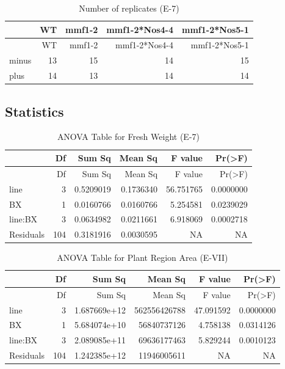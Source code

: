 \documentclass[
  10pt,
]{article}
\begin{document}
\begin{longtable}[]{@{}lrrrr@{}}
\caption{Number of replicates (E-7)}\tabularnewline
\toprule\noalign{}
& WT & mmf1-2 & mmf1-2*Nos4-4 & mmf1-2*Nos5-1 \\
\midrule\noalign{}
\endfirsthead
\toprule\noalign{}
& WT & mmf1-2 & mmf1-2*Nos4-4 & mmf1-2*Nos5-1 \\
\midrule\noalign{}
\endhead
\bottomrule\noalign{}
\endlastfoot
minus & 13 & 15 & 14 & 15 \\
plus & 14 & 13 & 14 & 14 \\
\end{longtable}

\subsection{Statistics}\label{statistics-3}

\begin{longtable}[]{@{}lrrrrr@{}}
\caption{ANOVA Table for Fresh Weight (E-7)}\tabularnewline
\toprule\noalign{}
& Df & Sum Sq & Mean Sq & F value & Pr(\textgreater F) \\
\midrule\noalign{}
\endfirsthead
\toprule\noalign{}
& Df & Sum Sq & Mean Sq & F value & Pr(\textgreater F) \\
\midrule\noalign{}
\endhead
\bottomrule\noalign{}
\endlastfoot
line & 3 & 0.5209019 & 0.1736340 & 56.751765 & 0.0000000 \\
BX & 1 & 0.0160766 & 0.0160766 & 5.254581 & 0.0239029 \\
line:BX & 3 & 0.0634982 & 0.0211661 & 6.918069 & 0.0002718 \\
Residuals & 104 & 0.3181916 & 0.0030595 & NA & NA \\
\end{longtable}

\begin{longtable}[]{@{}lrrrrr@{}}
\caption{ANOVA Table for Plant Region Area (E-VII)}\tabularnewline
\toprule\noalign{}
& Df & Sum Sq & Mean Sq & F value & Pr(\textgreater F) \\
\midrule\noalign{}
\endfirsthead
\toprule\noalign{}
& Df & Sum Sq & Mean Sq & F value & Pr(\textgreater F) \\
\midrule\noalign{}
\endhead
\bottomrule\noalign{}
\endlastfoot
line & 3 & 1.687669e+12 & 562556426788 & 47.091592 & 0.0000000 \\
BX & 1 & 5.684074e+10 & 56840737126 & 4.758138 & 0.0314126 \\
line:BX & 3 & 2.089085e+11 & 69636177463 & 5.829244 & 0.0010123 \\
Residuals & 104 & 1.242385e+12 & 11946005611 & NA & NA \\
\end{longtable}
\end{document}
